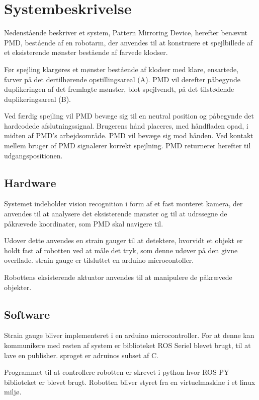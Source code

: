 \chapter{Systembeskrivelse}\label{chap:Systembeskrivelse}
Nedenstående beskriver et system, Pattern Mirroring Device, herefter benævnt PMD, bestående af en
robotarm, der anvendes til at konstruere et spejlbillede af et eksisterende mønster bestående af
farvede klodser.

Før spejling klargøres et mønster bestående af klodser med klare, ensartede, farver på det
dertilhørende opstillingsareal (A).
PMD vil derefter påbegynde duplikeringen af det fremlagte mønster, blot spejlvendt, på det
tilstødende duplikeringsareal (B).

Ved færdig spejling vil PMD bevæge sig til en neutral position og påbegynde det hard­codede
afslutningssignal. Brugerens hånd placeres, med håndfladen opad, i midten af PMD’s
arbejdsområde. PMD vil bevæge sig mod hånden. Ved kontakt
mellem bruger of PMD signalerer korrekt spejlning. PMD returnerer herefter til udgangspositionen.

\section{Hardware}\label{sec:Hardware}
Systemet indeholder vision recognition i form af et fast monteret kamera, der anvendes til at
analysere det eksisterende mønster og til at udrssegne de påkrævede koordinater, som PMD skal
navigere til. 

Udover dette anvendes en strain gauger til at detektere, hvorvidt et objekt er holdt fast af robotten 
ved at måle det tryk, som denne udøver på den givne overflade. strain gauge er tilsluttet en arduino microcontoller.

Robottens eksisterende aktuator anvendes til at manipulere de påkrævede objekter.
\section{Software}\label{sec:Software}
Strain gauge bliver implementeret i en arduino microcontroller. For at denne kan kommunikere med resten af system er
biblioteket ROS Seriel blevet brugt, til at lave en publisher. sproget er adruinos subset af C.

Programmet til at controllere robotten er skrevet i python hvor ROS PY biblioteket er blevet brugt. Robotten bliver styret fra en virtuelmaskine i et linux miljø.